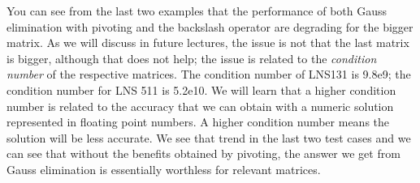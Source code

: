 You can see from the last two examples that the performance of both Gauss elimination with pivoting and the backslash operator are degrading for the bigger matrix.  As we will discuss in future lectures, the issue is not that the last matrix is bigger, although that does not help; the issue is related to the \emph{condition number} of the respective matrices.  The condition number of LNS131 is 9.8e9; the condition number for LNS 511 is 5.2e10.  We will learn that a higher condition number is related to the accuracy that we can obtain with a numeric solution represented in floating point numbers.  A higher condition number means the solution will be less accurate.  We see that trend in the last two test cases and we can see that without the benefits obtained by pivoting, the answer we get from Gauss elimination is essentially worthless for relevant matrices.


